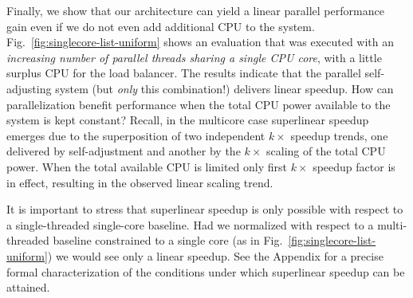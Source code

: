 Finally, we show that our architecture can yield a linear parallel performance gain even if we do not even add additional CPU to the system. Fig.~\ref{fig:singlecore-list-uniform} shows an evaluation that was executed with an \emph{increasing number of parallel threads sharing a single CPU core}, with a little surplus CPU for the load balancer.  The results indicate that the parallel self-adjusting system (but \emph{only} this combination!) delivers linear speedup.  How can parallelization benefit performance when the total CPU power available to the system is kept constant? Recall, in the multicore case superlinear speedup emerges due to the superposition of two independent $k\times$ speedup trends, one delivered by self-adjustment and another by the $k\times$ scaling of the total CPU power. When the total available CPU is limited only first $k\times$ speedup factor is in effect, resulting in the observed linear scaling trend.

It is important to stress that superlinear speedup is only possible with respect to a single-threaded single-core baseline. Had we normalized with respect to a multi-threaded baseline constrained to a single core (as in Fig.~\ref{fig:singlecore-list-uniform}) we would see only a linear speedup. See the Appendix for a precise formal characterization of the conditions under which superlinear speedup can be attained.


%





